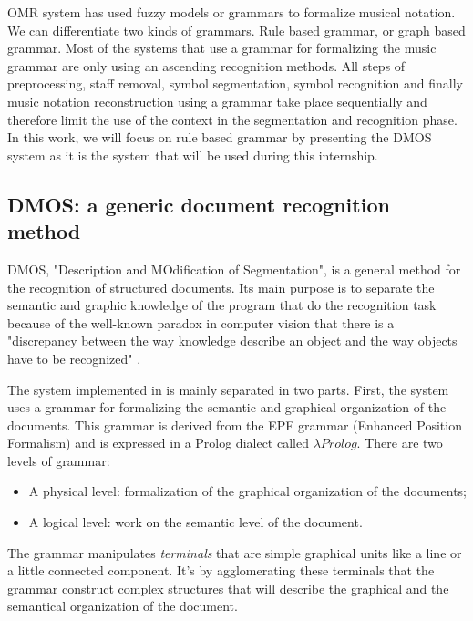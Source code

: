 \documentclass[11pt]{sdm}
\begin{document}
OMR system has used fuzzy models or grammars to formalize musical notation.
We can differentiate two kinds of grammars.
Rule based grammar, or graph based grammar.
Most of the systems that use a grammar for formalizing the music grammar are only using an ascending recognition methods.
All steps of preprocessing, staff removal, symbol segmentation, symbol recognition and finally music notation reconstruction using a grammar take place sequentially and therefore limit the use of the context in the segmentation and recognition phase.
In this work, we will focus on rule based grammar by presenting the DMOS system \cite{couasnon_dmos_2001} as it is the system that will be used during this internship.

\subsection{DMOS: a generic document recognition method}

DMOS, "Description and MOdification of Segmentation", is a general method for the recognition of structured documents.
Its main purpose is to separate the semantic and graphic knowledge of the program that do the recognition task because of the well-known paradox in computer vision that there is a "discrepancy between the way knowledge describe an object and the way objects have to be recognized" \cite{couasnon_dmos_2001}.

The system implemented in \cite{couasnon_dmos_2001} is mainly separated in two parts.
First, the system uses a grammar for formalizing the semantic and graphical organization of the documents.
This grammar is derived from the EPF grammar (Enhanced Position Formalism) and is expressed in a Prolog dialect called $\lambda Prolog$.
There are two levels of grammar:
\begin{itemize}
  \item A physical level: formalization of the graphical organization of the documents;
  \item A logical level: work on the semantic level of the document.
\end{itemize}
The grammar manipulates \textit{terminals} that are simple graphical units like a line or a little connected component.
It’s by agglomerating these terminals that the grammar construct complex structures that will describe the graphical and the semantical organization of the document.
\end{document}
